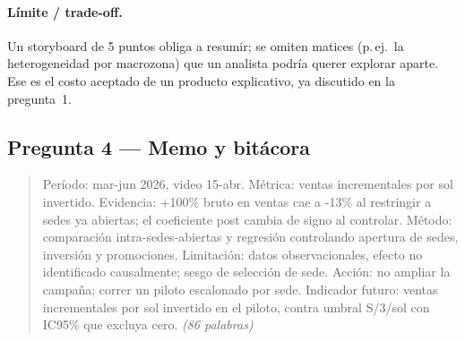 \paragraph{Límite / trade-off.} Un storyboard de 5 puntos obliga a resumir; se omiten matices (p.\,ej.\ la heterogeneidad por macrozona) que un analista podría querer explorar aparte. Ese es el costo aceptado de un producto explicativo, ya discutido en la pregunta~1.

\subsection{Pregunta 4 --- Memo y bitácora}\label{ssec:c5-q4}

\begin{quote}
Período: mar-jun 2026, video 15-abr. Métrica: ventas incrementales por sol invertido. Evidencia: +100\% bruto en ventas cae a -13\% al restringir a sedes ya abiertas; el coeficiente post cambia de signo al controlar. Método: comparación intra-sedes-abiertas y regresión controlando apertura de sedes, inversión y promociones. Limitación: datos observacionales, efecto no identificado causalmente; sesgo de selección de sede. Acción: no ampliar la campaña; correr un piloto escalonado por sede. Indicador futuro: ventas incrementales por sol invertido en el piloto, contra umbral S/3/sol con IC95\% que excluya cero. \emph{(86 palabras)}
\end{quote}


